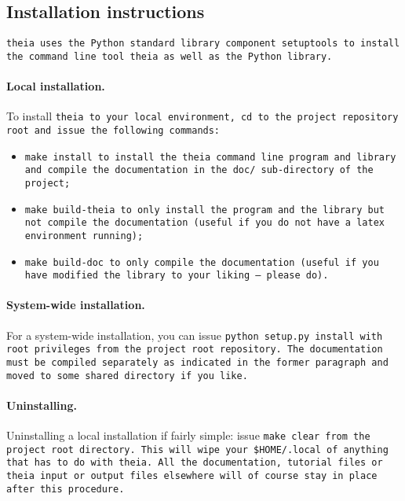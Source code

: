 \documentclass{article}
\begin{document}
\subsection{Installation instructions}
\tt{theia} uses the Python standard library component \tt{setuptools} to install the command line tool \tt{theia} as well as the Python library.

\paragraph{Local installation.}To install \tt{theia} to your local environment, \tt{cd} to the project repository root and issue the following commands:

\begin{itemize}
\item \tt{make install} to install the \tt{theia} command line program and library and compile the documentation in the \tt{doc/} sub-directory of the project;
\item \tt{make build-theia} to only install the program and the library but not compile the documentation (useful if you do not have a latex environment running);
\item \tt{make build-doc} to only compile the documentation (useful if you have modified the library to your liking --~please do).
\end{itemize}


\paragraph{System-wide installation.}For a system-wide installation, you can issue \tt{python setup.py install} with root privileges from the project root repository. The documentation must be compiled separately as indicated in the former paragraph and moved to some shared directory if you like.

\paragraph{Uninstalling.} Uninstalling a local installation if fairly simple: issue \tt{make clear} from the project root directory. This will wipe your \tt{\$HOME/.local} of anything that has to do with \tt{theia}. All the documentation, tutorial files or \tt{theia} input or output files elsewhere will of course stay in place after this procedure.
\end{document}
